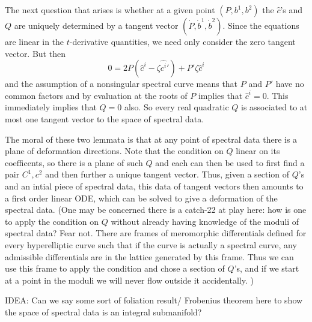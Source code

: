 The next question that arises is whether at a given point $(P,b^1,b^2)$ the $\hat c$'s and $Q$ are uniquely determined by a tangent vector $(\dot P, \dot b^1, \dot b^2)$. Since the equations are linear in the $t$-derivative quantities, we need only consider the zero tangent vector. But then
\[
0 = 2P\left( \hat c^i - \zeta\hat {c^i}'\right) + P'\zeta\hat c^i
\]
and the assumption of a nonsingular spectral curve means that $P$ and $P'$ have no common factors and by evaluation at the roots of $P$ implies that $\hat c^i=0$. This immediately implies that $Q=0$ also. So every real quadratic $Q$ is associated to at most one tangent vector to the space of spectral data.

The moral of these two lemmata is that at any point of spectral data there is a plane of deformation directions. Note that the condition on $Q$ linear on its coefficents, so there is a plane of such $Q$ and each can then be used to first find a pair $C^1,c^2$ and then further a unique tangent vector. Thus, given a section of $Q$'s and an intial piece of spectral data, this data of tangent vectors then amounts to a first order linear ODE, which can be solved to give a deformation of the spectral data. (One may be concerned there is a catch-22 at play here: how is one to apply the condition on $Q$ without already having knowledge of the moduli of spectral data? Fear not. There are frames of meromorphic differentials defined for every hyperelliptic curve such that if the curve is actually a spectral curve, any admissible differentials are in the lattice generated by this frame. Thus we can use this frame to apply the condition and chose a section of $Q$'s, and if we start at a point in the moduli we will never flow outside it accidentally. )

IDEA: Can we say some sort of foliation result/ Frobenius theorem here to show the space of spectral data is an integral submanifold? 











